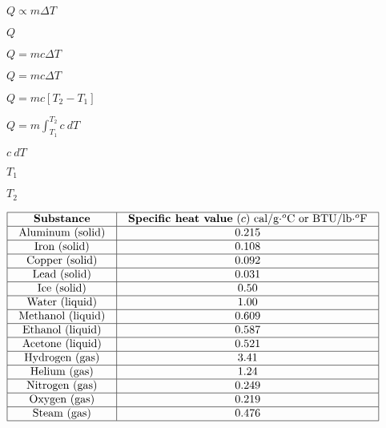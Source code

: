 \documentclass[12pt,a4paper,margin=2cm]{book}
\def\lthtmlcheckvsize{\ifdim\ht\sizebox<\vsize 
  \ifdim\wd\sizebox<\hsize\expandafter\hfill\fi \expandafter\vfill
  \else\expandafter\vss\fi}%
\begin{document}
{\newpage\clearpage
{}%
$\displaystyle Q \propto m \Delta T$%
\lthtmlindisplaymathZ
\lthtmlcheckvsize\clearpage}

{\newpage\clearpage
{}%
$ Q$%
\lthtmlindisplaymathZ
\lthtmlcheckvsize\clearpage}

{\newpage\clearpage
{}%
$\displaystyle Q = mc \Delta T$%
\lthtmlindisplaymathZ
\lthtmlcheckvsize\clearpage}

{\newpage\clearpage
{}%
$ Q = mc \Delta T$%
\lthtmlindisplaymathZ
\lthtmlcheckvsize\clearpage}

{\newpage\clearpage
{}%
$ Q = mc [T_2 - T_1]$%
\lthtmlindisplaymathZ
\lthtmlcheckvsize\clearpage}

{\newpage\clearpage
{}%
$ Q = m \int_{T_1}^{T_2} c \> dT$%
\lthtmlindisplaymathZ
\lthtmlcheckvsize\clearpage}

{\newpage\clearpage
{}%
$ c \> dT$%
\lthtmlindisplaymathZ
\lthtmlcheckvsize\clearpage}

{\newpage\clearpage
{}%
$ T_1$%
\lthtmlindisplaymathZ
\lthtmlcheckvsize\clearpage}

{\newpage\clearpage
{}%
$ T_2$%
\lthtmlindisplaymathZ
\lthtmlcheckvsize\clearpage}

{\newpage\clearpage
{}%
$\displaystyle \vbox{\offinterlineskip
\halign{\strut
\vrule \quad\hfil # \  \hfil & 
\vrule \quad\hfil # \  \hfil \vrule \cr
\noalign{\hrule }
\textbf{Substance} & \textbf{Specific heat value} ($c$) cal/g$\cdot^{o}$C or BTU/lb$\cdot$$^{o}$F \cr
\noalign{\hrule }
Aluminum (solid) & 0.215 \cr
\noalign{\hrule }
Iron (solid) & 0.108 \cr
\noalign{\hrule }
Copper (solid) & 0.092 \cr
\noalign{\hrule }
Lead (solid) & 0.031 \cr
\noalign{\hrule }
Ice (solid) & 0.50 \cr
\noalign{\hrule }
Water (liquid) & 1.00 \cr
\noalign{\hrule }
Methanol (liquid) & 0.609 \cr
\noalign{\hrule }
Ethanol (liquid) & 0.587 \cr
\noalign{\hrule }
Acetone (liquid) & 0.521 \cr
\noalign{\hrule }
Hydrogen (gas) & 3.41 \cr
\noalign{\hrule }
Helium (gas) & 1.24 \cr
\noalign{\hrule }
Nitrogen (gas) & 0.249 \cr
\noalign{\hrule }
Oxygen (gas) & 0.219 \cr
\noalign{\hrule }
Steam (gas) & 0.476 \cr
\noalign{\hrule }
} %
}$%
\lthtmlindisplaymathZ
\lthtmlcheckvsize\clearpage}
\end{document}
